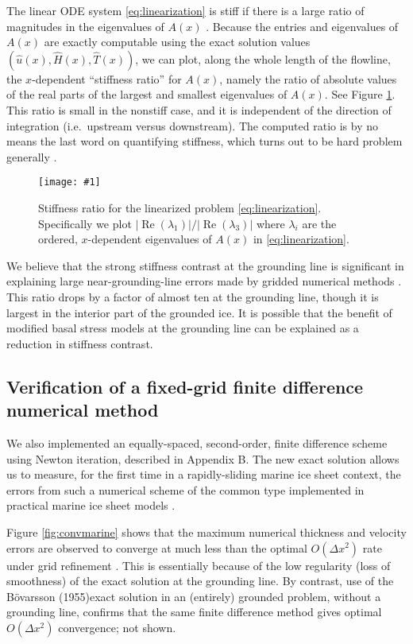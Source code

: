 \documentclass[review,letterpaper]{igs}
\renewcommand{\dh}{\fontencoding{T1}\selectfont{\symbol{240}}}
\newcommand{\onecol}[1]{\texttt{[image: \#1]}}
\newcommand{\citebod}{B\"o\dh varsson (1955)\nocite{Bodvardsson}}
\newcommand{\hu}{\hat u}
\newcommand{\hH}{\hat H}
\newcommand{\hT}{\hat T}
\begin{document}
The linear ODE system \eqref{eq:linearization} is stiff if there is a large ratio of magnitudes in the eigenvalues of $A(x)$ \citep{Pressetal}.  Because the entries and eigenvalues of $A(x)$ are exactly computable using the exact solution values $(\hu(x),\hH(x),\hT(x))$, we can plot, along the whole length of the flowline, the $x$-dependent ``stiffness ratio'' for $A(x)$, namely the ratio of absolute values of the real parts of the largest and smallest eigenvalues of $A(x)$.  See Figure \ref{fig:stiffness}.  This ratio is small in the nonstiff case, and it is independent of the direction of integration (i.e.~upstream versus downstream).  The computed ratio is by no means the last word on quantifying stiffness, which turns out to be hard problem generally \citep[e.g.][]{HighamTrefethen1993}.

\begin{figure}[ht]
\onecol{exactmarine-stiffness-ratio}
\caption{Stiffness ratio for the linearized problem \eqref{eq:linearization}.  Specifically we plot $|\operatorname{Re}(\lambda_1)|/|\operatorname{Re}(\lambda_3)|$ where $\lambda_i$ are the ordered, $x$-dependent eigenvalues of $A(x)$ in \eqref{eq:linearization}.} \label{fig:stiffness}
\end{figure}

We believe that the strong stiffness contrast at the grounding line is significant in explaining large near-grounding-line errors made by gridded numerical methods \citep{Gladstoneetal2010,MISMIP2012}.  This ratio drops by a factor of almost ten at the grounding line, though it is largest in the interior part of the grounded ice.  It is possible that the benefit of modified basal stress models at the grounding line \citep[for example]{Leguyetal2014TCD} can be explained as a reduction in stiffness contrast.

\subsection*{Verification of a fixed-grid finite difference numerical method}  We also implemented an equally-spaced, second-order, finite difference scheme using Newton iteration, described in Appendix B.  The new exact solution allows us to measure, for the first time in a rapidly-sliding marine ice sheet context, the errors from such a numerical scheme of the common type implemented in practical marine ice sheet models \citep[e.g.][]{PollardDeConto2009WAIS,Winkelmannetal2011}.

Figure \ref{fig:convmarine} shows that the maximum numerical thickness and velocity errors are observed to converge at much less than the optimal $O(\Delta x^2)$ rate under grid refinement \citep{MortonMayers}.  This is essentially because of the low regularity (loss of smoothness) of the exact solution at the grounding line.  By contrast, use of the \citebod exact solution in an (entirely) grounded problem, without a grounding line, confirms that the same finite difference method gives optimal $O(\Delta x^2)$ convergence; not shown.
\end{document}

